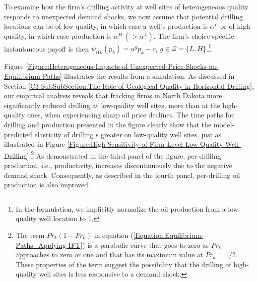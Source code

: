To examine how the firm's drilling activity at well sites of heterogeneous quality responds to unexpected demand shocks, we now assume that potential drilling locations can be of low quality, in which case a well's production is $\alpha^{L}$ or of high quality, in which case production is $\alpha^{H} \ (> \alpha^{L})$. The firm's choice-specific instantaneous payoff is then $\psi_{i1k}(p_{k}) = \alpha^{g} p_{k} - c$, $g \in \mathcal{Q} = \{ L, H \}$.\footnote{In the formulation, we implicitly normalize the oil production from a low-quality well location to 1.} 

Figure \ref{Figure:Heterogeneous-Impacts-of-Unexpected-Price-Shocks-on-Equilibrium-Paths} illustrates the results from a simulation. As discussed in Section \ref{C3-SubSubSection:The-Role-of-Geological-Quality-in-Horizontal-Drilling}, our empirical analysis reveals that fracking firms in North Dakota more significantly reduced drilling at low-quality well sites, more than at the high-quality ones, when experiencing sharp oil price declines. The time paths for drilling and production presented in the figure clearly show that the model-predicted elasticity of drilling s greater on low-quality well sites, just as illustrated in Figure \ref{Figure:High-Sensitivity-of-Firm-Level-Low-Quality-Well-Drilling}.\footnote{The term $Pr_{k}(1 - Pr_{k})$ in equation (\ref{Equation:Equilibrium-Paths_Applying-IFT}) is a parabolic curve that goes to zero as $Pr_{k}$ approaches to zero or one and that has its maximum value at $Pr_{k} = 1/2$. These properties of the term suggest the possibility that the drilling of high-quality well sites is less responsive to a demand shock.} As demonstrated in the third panel of the figure, per-drilling production, i.e., productivity, increases discontinuously due to the negative demand shock. Consequently, as described in the fourth panel, per-drilling oil production is also improved. 
